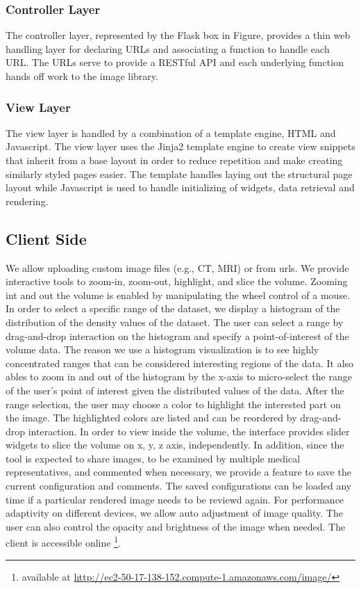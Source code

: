 \documentclass[annual]{acmsiggraph}
\begin{document}
\subsubsection{Controller Layer}
	The controller layer, represented by the Flask box in Figure, provides a thin web handling layer for declaring URLs and associating a function to handle each URL.  The URLs serve to provide a RESTful API and each underlying function hands off work to the image library.

\subsubsection{View Layer}
	The view layer is handled by a combination of a template engine, HTML and Javascript.  The view layer uses the Jinja2 template engine to create view snippets that inherit from a base layout in order to reduce repetition and make creating similarly styled pages easier.  The template handles laying out the structural page layout while Javascript is used to handle initializing of widgets, data retrieval and rendering.

\subsection{Client Side}
We allow uploading custom image files (e.g., CT, MRI) or from urls. We provide interactive tools to zoom-in, zoom-out, highlight, and slice the volume. Zooming int and out the volume is enabled by manipulating the wheel control of a mouse. In order to select a specific range of the dataset, we display a histogram of the distribution of the density values of the dataset. The user can select a range by drag-and-drop interaction on the histogram and specify a point-of-interest of the volume data. The reason we use a histogram visualization is to see highly concentrated ranges that can be considered interesting regions of the data. It also ables to zoom in and out of the histogram by the x-axis to micro-select the range of the user's point of interest given the distributed values of the data. After the range selection, the user may choose a color to highlight the interested part on the image. The highlighted colors are listed and can be reordered by drag-and-drop interaction. In order to view inside the volume, the interface provides slider widgets to slice the volume on x, y, z axis, independently. In addition, since the tool is expected to share images, to be examined by multiple medical representatives, and commented when necessary, we provide a feature to save the current configuration and comments. The saved configurations can be loaded any time if a particular rendered image needs to be reviewd again. For performance adaptivity on different devices, we allow auto adjustment of image quality. The user can also control the opacity and brightness of the image when needed. The client is accessible online \footnote{available at \url{http://ec2-50-17-138-152.compute-1.amazonaws.com/image/}}.
\end{document}
